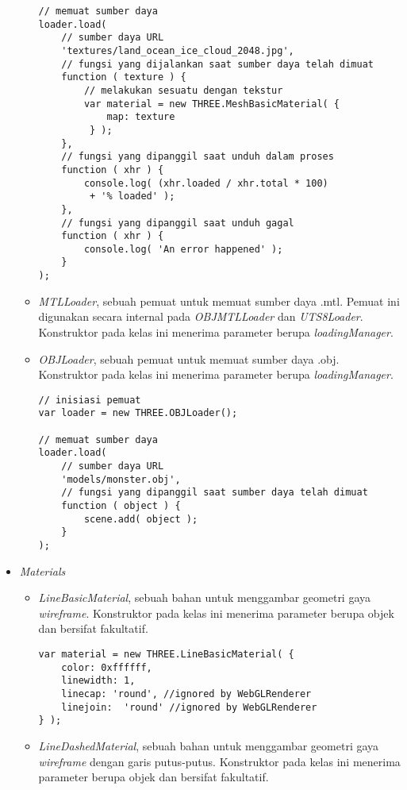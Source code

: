 \begin{itemize}
\begin{itemize}
\begin{lstlisting}[caption={Contoh penggunaan kelas {\it TextureLoader}.},captionpos=b]
// memuat sumber daya
loader.load(
	// sumber daya URL
	'textures/land_ocean_ice_cloud_2048.jpg',
	// fungsi yang dijalankan saat sumber daya telah dimuat
	function ( texture ) {
		// melakukan sesuatu dengan tekstur
		var material = new THREE.MeshBasicMaterial( {
			map: texture
		 } );
	},
	// fungsi yang dipanggil saat unduh dalam proses
	function ( xhr ) {
		console.log( (xhr.loaded / xhr.total * 100)
		 + '% loaded' );
	},
	// fungsi yang dipanggil saat unduh gagal
	function ( xhr ) {
		console.log( 'An error happened' );
	}
);
\end{lstlisting}

	\item {\it MTLLoader}, sebuah pemuat untuk memuat sumber daya .mtl. Pemuat ini digunakan secara internal pada {\it OBJMTLLoader} dan {\it UTS8Loader}. Konstruktor pada kelas ini menerima parameter berupa  {\it loadingManager}.
	
	\item {\it OBJLoader}, sebuah pemuat untuk memuat sumber daya .obj. Konstruktor pada kelas ini menerima parameter berupa  {\it loadingManager}.
	
\begin{lstlisting}[caption={Contoh penggunaan kelas {\it OBJLoader}.},captionpos=b]
// inisiasi pemuat
var loader = new THREE.OBJLoader();

// memuat sumber daya
loader.load(
	// sumber daya URL
	'models/monster.obj',
	// fungsi yang dipanggil saat sumber daya telah dimuat
	function ( object ) {
		scene.add( object );
	}
);
\end{lstlisting}
	\end{itemize}

\item \textit{Materials}

	\begin{itemize}
	\item {\it LineBasicMaterial}, sebuah bahan untuk menggambar geometri gaya {\it wireframe}. Konstruktor pada kelas ini menerima parameter berupa objek dan bersifat fakultatif.
	
\begin{lstlisting}[caption={Contoh penggunaan kelas {\it LineBasicMaterial}.},captionpos=b]
var material = new THREE.LineBasicMaterial( {
	color: 0xffffff,
	linewidth: 1,
	linecap: 'round', //ignored by WebGLRenderer
	linejoin:  'round' //ignored by WebGLRenderer
} );
\end{lstlisting}

	\item {\it LineDashedMaterial}, sebuah bahan untuk menggambar geometri gaya {\it wireframe} dengan garis putus-putus. Konstruktor pada kelas ini menerima parameter berupa objek dan bersifat fakultatif.
	

\end{itemize}
\end{itemize}

